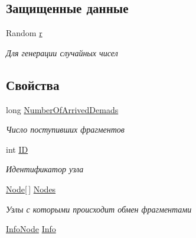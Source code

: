 \subsection*{Защищенные данные}
\begin{DoxyCompactItemize}
\item 
Random \hyperlink{class_network_simulator_1_1_node_a3eb74310ed895ee8ec49c1850c1c405e}{r}
\begin{DoxyCompactList}\small\item\em Для генерации случайных чисел \end{DoxyCompactList}\end{DoxyCompactItemize}
\subsection*{Свойства}
\begin{DoxyCompactItemize}
\item 
long \hyperlink{class_network_simulator_1_1_node_a24aabc6ded4e970b0c2c5c3bcbdf6cd8}{Number\+Of\+Arrived\+Demads}
\begin{DoxyCompactList}\small\item\em Число поступивших фрагментов \end{DoxyCompactList}\item 
int \hyperlink{class_network_simulator_1_1_node_a1ba068212f50babe026c527a9b5fb55a}{ID}
\begin{DoxyCompactList}\small\item\em Идентификатор узла \end{DoxyCompactList}\item 
\hyperlink{class_network_simulator_1_1_node}{Node}\mbox{[}$\,$\mbox{]} \hyperlink{class_network_simulator_1_1_node_abae5930cce02aa93551aefe417b23fa0}{Nodes}
\begin{DoxyCompactList}\small\item\em Узлы с которыми происходит обмен фрагментами \end{DoxyCompactList}\item 
\hyperlink{class_network_simulator_1_1_info_node}{Info\+Node} \hyperlink{class_network_simulator_1_1_node_a63e706d7158c6ea84ea8fdbe61d9bffb}{Info}

\end{DoxyCompactItemize}
